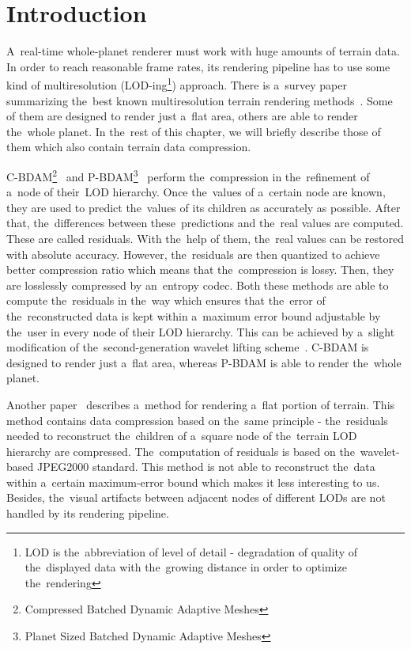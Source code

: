 \chapter{Introduction}



A~real-time whole-planet renderer must work with huge amounts of terrain data. In order to reach reasonable frame rates, its rendering pipeline has to use some kind of multiresolution (LOD-ing\footnote{LOD is the~abbreviation of level of detail - degradation of quality of the~displayed data with the~growing distance in order to optimize the~rendering}) approach. There is a~survey paper summarizing the~best known multiresolution terrain rendering methods~\cite{survey}. Some of them are designed to render just a~flat area, others are able to render the~whole planet. In the~rest of this chapter, we will briefly describe those of them which also contain terrain data compression.

C-BDAM\footnote{Compressed Batched Dynamic Adaptive Meshes}~\cite{cbdam} and P-BDAM\footnote{Planet Sized Batched Dynamic Adaptive Meshes}~\cite{pbdam} perform the~compression in the~refinement of a~node of their~LOD hierarchy. Once the~values of a~certain node are known, they are used to predict the~values of its children as accurately as possible. After that, the~differences between these~predictions and the~real values are computed. These are called residuals. With the~help of them, the~real values can be restored with absolute accuracy. However, the~residuals are then quantized to achieve better compression ratio which means that the~compression is lossy. Then, they are losslessly compressed by an~entropy codec. Both these methods are able to compute the~residuals in the~way which ensures that the~error of the~reconstructed data is kept within a~maximum error bound adjustable by the~user in every node of their LOD hierarchy. This can be achieved by a~slight modification of the~second-generation wavelet lifting scheme~\cite{two-stage}. C-BDAM is designed to render just a~flat area, whereas P-BDAM is able to render the~whole planet.

Another paper~\cite{jpeg2000terrain} describes a~method for rendering a~flat portion of terrain. This method contains data compression based on the~same principle - the~residuals needed to reconstruct the~children of a~square node of the~terrain LOD hierarchy are compressed. The~computation of residuals is based on the~wavelet-based JPEG2000 standard. This method is not able to reconstruct the~data within a~certain maximum-error bound which makes it less interesting to us. Besides, the~visual artifacts between adjacent nodes of different LODs are not handled by its rendering pipeline.


